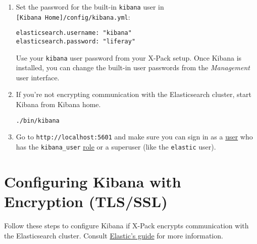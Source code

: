 \begin{enumerate}
\def\labelenumi{\arabic{enumi}.}
\item
  Set the password for the built-in \texttt{kibana} user in
  \texttt{{[}Kibana\ Home{]}/config/kibana.yml}:

\begin{verbatim}
elasticsearch.username: "kibana"
elasticsearch.password: "liferay"
\end{verbatim}

  Use your \texttt{kibana} user password from your X-Pack setup. Once
  Kibana is installed, you can change the built-in user passwords from
  the \emph{Management} user interface.
\item
  If you're not encrypting communication with the Elasticsearch cluster,
  start Kibana from Kibana home.

\begin{verbatim}
./bin/kibana
\end{verbatim}
\item
  Go to \texttt{http://localhost:5601} and make sure you can sign in as
  a
  \href{https://www.elastic.co/guide/en/elasticsearch/reference/current/realms.html}{user}
  who has the \texttt{kibana\_user}
  \href{https://www.elastic.co/guide/en/elasticsearch/reference/current/built-in-roles.html}{role}
  or a superuser (like the \texttt{elastic} user).
\end{enumerate}

\section{Configuring Kibana with Encryption
(TLS/SSL)}\label{configuring-kibana-with-encryption-tlsssl}

Follow these steps to configure Kibana if X-Pack encrypts communication
with the Elasticsearch cluster. Consult
\href{https://www.elastic.co/guide/en/kibana/7.x/using-kibana-with-security.html\#using-kibana-with-security}{Elastic's
guide} for more information.

